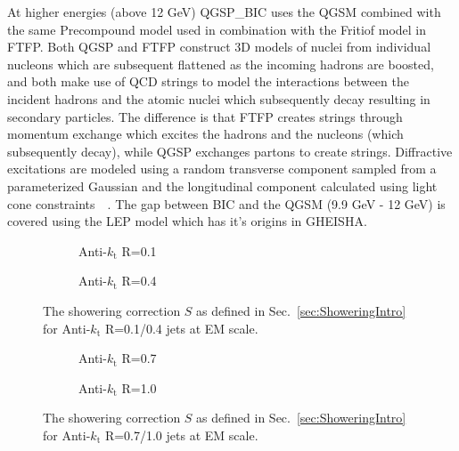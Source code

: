 At higher energies (above 12 GeV) QGSP\_BIC uses the \gls{QGSM} combined with the same Precompound model used in combination with the Fritiof model in FTFP.  
Both QGSP and FTFP construct 3D models of nuclei from individual nucleons which are subsequent flattened as the incoming hadrons are boosted, and both make use of QCD strings to model the interactions between the incident hadrons and the atomic nuclei which subsequently decay resulting in secondary particles.  
The difference is that FTFP creates strings through momentum exchange which excites the hadrons and the nucleons (which subsequently decay), while QGSP exchanges partons to create strings.  
Diffractive excitations are modeled using a random transverse component sampled from a parameterized Gaussian and the longitudinal component calculated using light cone constraints~\cite{GEANT4}~\cite{GEANT4Man}.   
The gap between BIC and the QGSM (9.9 GeV - 12 GeV) is covered using the \gls{LEP} model which has it's origins in {\sc GHEISHA}\cite{Fesefeldt:1985yw}.  

\begin{figure}[!ht]
  \centering
  \begin{subfigure}{.5\textwidth}
    \centering
    \caption{Anti-$k_\mathrm{t}$ R=0.1}
  \end{subfigure}%
  \begin{subfigure}{.5\textwidth}  \centering
    \caption{Anti-$k_\mathrm{t}$ R=0.4}
  \end{subfigure}
  \caption[Showering correction using Anti-$k_\mathrm{t}$ R=0.1/0.4 jets]
{\small The showering correction $S$ as defined in Sec.~\ref{sec:ShoweringIntro} for Anti-$k_\mathrm{t}$ R=0.1/0.4 jets at EM scale.  }
  \label{Fig:Showering_1-4}
\end{figure}

\begin{figure}[!ht]
  \centering
  \begin{subfigure}{.5\textwidth}
    \centering
    \caption{Anti-$k_\mathrm{t}$ R=0.7}
  \end{subfigure}%
  \begin{subfigure}{.5\textwidth}  \centering
    \caption{Anti-$k_\mathrm{t}$ R=1.0}
  \end{subfigure}
  \caption[Showering correction using Anti-$k_\mathrm{t}$ R=0.7/1.0 jets]
{\small The showering correction $S$ as defined in Sec.~\ref{sec:ShoweringIntro} for Anti-$k_\mathrm{t}$ R=0.7/1.0 jets at EM scale.  }
  \label{Fig:Showering_7-10}
\end{figure}

